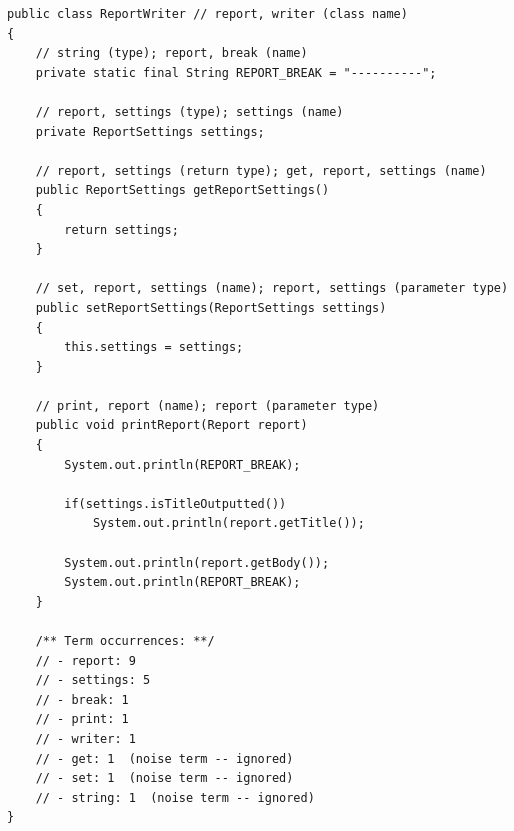 \begin{lstlisting}[caption={Code sample showing the extraction of terms from various elements of the source code. Above each element is a comment describing the terms extracted from the element and the part of the element they were extracted from. At the bottom is a list of the terms extracted (including noise terms that were ignored) and their occurrence count.}, label={lst:extraction_example}, float=t]
public class ReportWriter // report, writer (class name)
{   
    // string (type); report, break (name)
    private static final String REPORT_BREAK = "----------";

    // report, settings (type); settings (name)
    private ReportSettings settings;
    
    // report, settings (return type); get, report, settings (name)
    public ReportSettings getReportSettings()
    {
        return settings;
    }
    
    // set, report, settings (name); report, settings (parameter type)
    public setReportSettings(ReportSettings settings)
    {
        this.settings = settings;
    }
    
    // print, report (name); report (parameter type)
    public void printReport(Report report)
    {
        System.out.println(REPORT_BREAK);
        
        if(settings.isTitleOutputted())
            System.out.println(report.getTitle());
            
        System.out.println(report.getBody());
        System.out.println(REPORT_BREAK);
    }

	/** Term occurrences: **/
	// - report: 9
	// - settings: 5
	// - break: 1
	// - print: 1
	// - writer: 1
	// - get: 1  (noise term -- ignored)
	// - set: 1  (noise term -- ignored)
	// - string: 1  (noise term -- ignored)
}
\end{lstlisting}

% 
% 
% 
% 
% 
% 
% 

